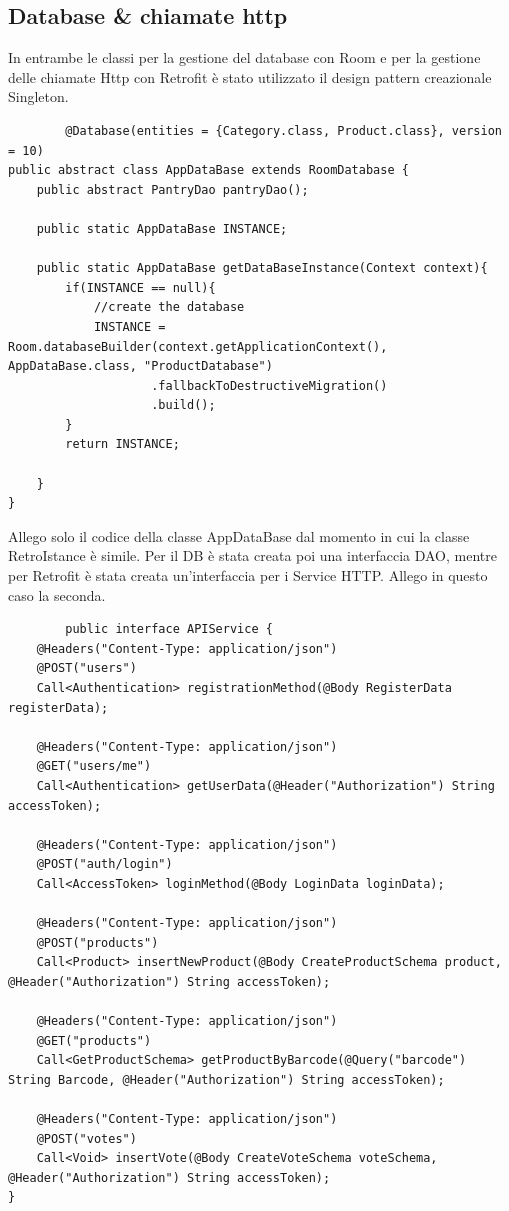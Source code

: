 \documentclass[12pt]{article}
\begin{document}
    \subsection{Database \& chiamate http}
    In entrambe le classi per la gestione del database con Room e per la gestione delle chiamate Http con Retrofit è stato utilizzato il design pattern creazionale 
    Singleton. 
    \begin{lstlisting}
        @Database(entities = {Category.class, Product.class}, version = 10)
public abstract class AppDataBase extends RoomDatabase {
    public abstract PantryDao pantryDao();

    public static AppDataBase INSTANCE;

    public static AppDataBase getDataBaseInstance(Context context){
        if(INSTANCE == null){
            //create the database
            INSTANCE = Room.databaseBuilder(context.getApplicationContext(), AppDataBase.class, "ProductDatabase")
                    .fallbackToDestructiveMigration()
                    .build();
        }
        return INSTANCE;

    }
}
    \end{lstlisting}
    Allego solo il codice della classe AppDataBase dal momento in cui la classe RetroIstance è simile. Per il DB è stata creata poi una interfaccia DAO, mentre 
    per Retrofit è stata creata un'interfaccia per i Service HTTP. Allego in questo caso la seconda.
    \begin{lstlisting}
        public interface APIService {
    @Headers("Content-Type: application/json")
    @POST("users")
    Call<Authentication> registrationMethod(@Body RegisterData registerData);

    @Headers("Content-Type: application/json")
    @GET("users/me")
    Call<Authentication> getUserData(@Header("Authorization") String accessToken);

    @Headers("Content-Type: application/json")
    @POST("auth/login")
    Call<AccessToken> loginMethod(@Body LoginData loginData);

    @Headers("Content-Type: application/json")
    @POST("products")
    Call<Product> insertNewProduct(@Body CreateProductSchema product, @Header("Authorization") String accessToken);

    @Headers("Content-Type: application/json")
    @GET("products")
    Call<GetProductSchema> getProductByBarcode(@Query("barcode") String Barcode, @Header("Authorization") String accessToken);

    @Headers("Content-Type: application/json")
    @POST("votes")
    Call<Void> insertVote(@Body CreateVoteSchema voteSchema, @Header("Authorization") String accessToken);
}
    \end{lstlisting}
\end{document}
